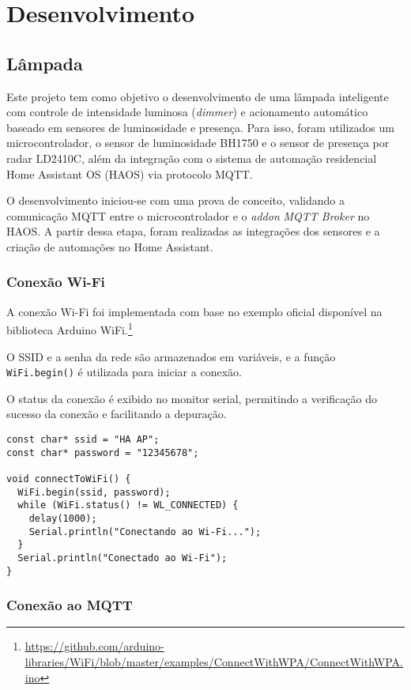 \documentclass[]{abntex2}
\begin{document}
\chapter{Desenvolvimento}
\section{Lâmpada}
Este projeto tem como objetivo o desenvolvimento de uma lâmpada inteligente com
controle de intensidade luminosa (\textit{dimmer}) e acionamento automático
baseado em sensores de luminosidade e presença. Para isso, foram utilizados um
microcontrolador, o sensor de luminosidade BH1750 e o sensor de presença por
radar LD2410C, além da integração com o sistema de automação residencial Home
Assistant OS (HAOS) via protocolo MQTT.

O desenvolvimento iniciou-se com uma prova de conceito, validando a comunicação
MQTT entre o microcontrolador e o \textit{addon} \textit{MQTT Broker} no HAOS.
A partir dessa etapa, foram realizadas as integrações dos sensores e a criação
de automações no Home Assistant.

\subsection{Conexão Wi-Fi}

A conexão Wi-Fi foi implementada com base no exemplo oficial disponível na
biblioteca Arduino
WiFi.\footnote{\url{https://github.com/arduino-libraries/WiFi/blob/master/examples/ConnectWithWPA/ConnectWithWPA.ino}}

O SSID e a senha da rede são armazenados em variáveis, e a função
\texttt{WiFi.begin()} é utilizada para iniciar a conexão.

O status da conexão é exibido no monitor serial, permitindo a verificação do
sucesso da conexão e facilitando a depuração.

\begin{verbatim}
const char* ssid = "HA AP";
const char* password = "12345678";

void connectToWiFi() {
  WiFi.begin(ssid, password);
  while (WiFi.status() != WL_CONNECTED) {
    delay(1000);
    Serial.println("Conectando ao Wi-Fi...");
  }
  Serial.println("Conectado ao Wi-Fi");
}
\end{verbatim}
\clearpage


\subsection{Conexão ao MQTT}
\end{document}

